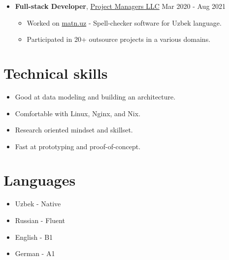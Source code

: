 \documentclass[a4paper,10pt]{article}
\begin{document}
\begin{itemize}[leftmargin=*]
  \item[] \textbf{Full-stack Developer}, \href{https://www.linkedin.com/company/pmuzbekistan/}{Project Managers LLC} \hfill
    \small{Mar 2020 - Aug 2021}
  \begin{itemize} \setlength{\itemsep}{1pt} \setlength{\parskip}{1pt}
    \item Worked on \href{https://matn.uz}{matn.uz} - Spell-checker software for Uzbek language.
    \item Participated in 20+ outsource projects in a various domains.
  \end{itemize}
\end{itemize}

\section*{Technical skills}

\begin{itemize} \setlength{\itemsep}{1pt} \setlength{\parskip}{1pt}
  \item Good at data modeling and building an architecture.
  \item Comfortable with Linux, Nginx, and Nix.
  \item Research oriented mindset and skillset.
  \item Fast at prototyping and proof-of-concept.
\end{itemize}

\section*{Languages}

\begin{itemize} \setlength{\itemsep}{1pt} \setlength{\parskip}{1pt}
  \item Uzbek - Native
  \item Russian - Fluent
  \item English - B1
  \item German - A1
\end{itemize}
\end{document}
